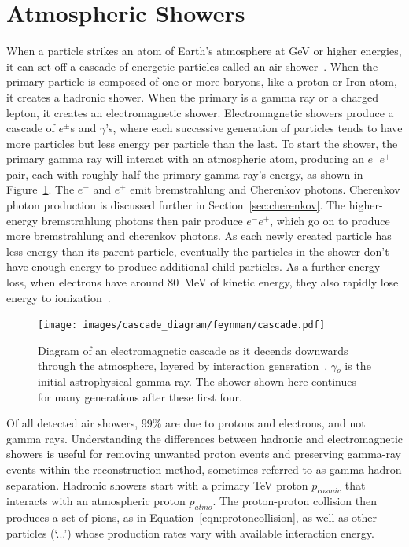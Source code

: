     \FloatBarrier
    
    
\section{Atmospheric Showers}

  When a particle strikes an atom of Earth's atmosphere at GeV or higher energies, it can set off a cascade of energetic particles called an air shower~\cite{Bethe1934,Klein1999}.
  When the primary particle is composed of one or more baryons, like a proton or Iron atom, it creates a hadronic shower.
  When the primary is a gamma ray or a charged lepton, it creates an electromagnetic shower.
  Electromagnetic showers produce a cascade of $e^{\pm}$s and $\gamma$'s, where each successive generation of particles tends to have more particles but less energy per particle than the last.
  To start the shower, the primary gamma ray will interact with an atmospheric atom, producing an $e^{-}e^{+}$ pair, each with roughly half the primary gamma ray's energy, as shown in Figure~\ref{fig:emcascade}.
  The $e^{-}$ and $e^{+}$ emit bremstrahlung and Cherenkov photons.
  Cherenkov photon production is discussed further in Section~\ref{sec:cherenkov}.
  The higher-energy bremstrahlung photons then pair produce $e^{-}e^{+}$, which go on to produce more bremstrahlung and cherenkov photons.
  As each newly created particle has less energy than its parent particle, eventually the particles in the shower don't have enough energy to produce additional child-particles.
  As a further energy loss, when electrons have around \SI{80}{MeV} of kinetic energy, they also rapidly lose energy to ionization~\cite{pdg_2014}.

  \begin{figure}[ht]
    \centering
    \texttt{[image: images/cascade\_diagram/feynman/cascade.pdf]}
    \caption[Electromagnetic Cascade]{
      Diagram of an electromagnetic cascade as it decends downwards through the atmosphere, layered by interaction generation~\cite{ellis2017tikz}.
      $\gamma{}_o$ is the initial astrophysical gamma ray.
      The shower shown here continues for many generations after these first four.
      \CaptionBlankLine
    }
    \label{fig:emcascade}
  \end{figure}

  Of all detected air showers, \nicetilde{}99\% are due to protons and electrons, and not gamma rays.
  Understanding the differences between hadronic and electromagnetic showers is useful for removing unwanted proton events and preserving gamma-ray events within the reconstruction method, sometimes referred to as gamma-hadron separation.
  Hadronic showers start with a primary \nicetilde TeV proton $p_{cosmic}$ that interacts with an atmospheric proton $p_{atmo}$.
  The proton-proton collision then produces a set of pions, as in Equation~\ref{eqn:protoncollision}, as well as other particles (`...') whose production rates vary with available interaction energy.
  
